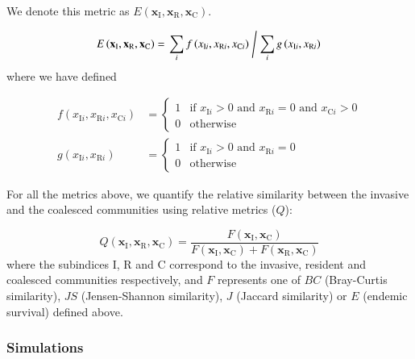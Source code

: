 \documentclass[a4paper,10pt]{article}
\begin{document}
We denote this
metric as
$E \left( \mathbf{x}_\mathrm{I},
\mathbf{x}_\mathrm{R},
\mathbf{x}_\mathrm{C} \right)$.

\begin{equation}
E \left( \mathbf{x}_\mathrm{I},
\mathbf{x}_\mathrm{R},
\mathbf{x}_\mathrm{C} \right) = 
\left.
\sum_i
f \left( x_{\mathrm{I}i}, x_{\mathrm{R}i}, x_{\mathrm{C}i} \right)
\;
\middle/
\;
\sum_i
g \left( x_{\mathrm{I}i}, x_{\mathrm{R}i} \right)
\right.
\label{eq:endemic}
\end{equation}
%
where we have defined

\begin{equation}
\begin{split}
f \left( x_{\mathrm{I}i}, x_{\mathrm{R}i}, x_{\mathrm{C}i} \right) & =
\begin{cases}
    1 & \text{if } x_{\mathrm{I}i} > 0 \text{ and }
                   x_{\mathrm{R}i} = 0 \text{ and }
                   x_{\mathrm{C}i} > 0 \\
    0 & \text{otherwise}
\end{cases} \\
g \left( x_{\mathrm{I}i}, x_{\mathrm{R}i} \right) & =
\begin{cases}
    1 & \text{if } x_{\mathrm{I}i} > 0 \text{ and }
                   x_{\mathrm{R}i} = 0 \\
    0 & \text{otherwise}
\end{cases}
\end{split}
\label{eq:endemic-f}
\end{equation}

\fi

For all the metrics above, we quantify the relative similarity between the invasive
and the coalesced communities using relative metrics ($Q$):

\begin{equation}
Q \left( \mathbf{x}_\mathrm{I},
\mathbf{x}_\mathrm{R},
\mathbf{x}_\mathrm{C} \right) = 
\frac{F \left( \mathbf{x}_\mathrm{I},\mathbf{x}_\mathrm{C}\right)}
{F \left( \mathbf{x}_\mathrm{I},\mathbf{x}_\mathrm{C}\right)
+
F \left( \mathbf{x}_\mathrm{R},\mathbf{x}_\mathrm{C}\right)}
\label{eq:q}
\end{equation}
%
where the subindices I, R and C correspond to the invasive, resident and coalesced
communities respectively, and $F$ represents one of $BC$ (Bray-Curtis similarity), $JS$
(Jensen-Shannon similarity), $J$ (Jaccard similarity) or $E$ (endemic survival) defined above.

\subsubsection*{Simulations}\label{methods:sim}
\end{document}
